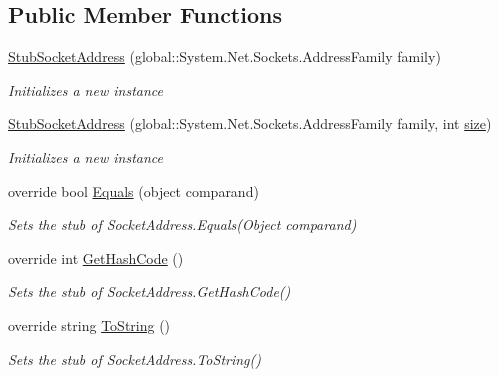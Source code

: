 \subsection*{Public Member Functions}
\begin{DoxyCompactItemize}
\item 
\hyperlink{class_system_1_1_net_1_1_fakes_1_1_stub_socket_address_a22cf09d542b76418ab8414ed43926c1b}{Stub\-Socket\-Address} (global\-::\-System.\-Net.\-Sockets.\-Address\-Family family)
\begin{DoxyCompactList}\small\item\em Initializes a new instance\end{DoxyCompactList}\item 
\hyperlink{class_system_1_1_net_1_1_fakes_1_1_stub_socket_address_a7b9ab31d32c2b97ddd1827447818d75d}{Stub\-Socket\-Address} (global\-::\-System.\-Net.\-Sockets.\-Address\-Family family, int \hyperlink{jquery-1_810_82_8js_afa6806c6ee5e63d5177f1dcc082ba6bc}{size})
\begin{DoxyCompactList}\small\item\em Initializes a new instance\end{DoxyCompactList}\item 
override bool \hyperlink{class_system_1_1_net_1_1_fakes_1_1_stub_socket_address_a2e7cd6dbd55cc830564f8af6611160ef}{Equals} (object comparand)
\begin{DoxyCompactList}\small\item\em Sets the stub of Socket\-Address.\-Equals(\-Object comparand)\end{DoxyCompactList}\item 
override int \hyperlink{class_system_1_1_net_1_1_fakes_1_1_stub_socket_address_a61fce931a33830093c856be7e28f5316}{Get\-Hash\-Code} ()
\begin{DoxyCompactList}\small\item\em Sets the stub of Socket\-Address.\-Get\-Hash\-Code()\end{DoxyCompactList}\item 
override string \hyperlink{class_system_1_1_net_1_1_fakes_1_1_stub_socket_address_adf9f1f87fc444ee955de657ec6b24281}{To\-String} ()
\begin{DoxyCompactList}\small\item\em Sets the stub of Socket\-Address.\-To\-String()\end{DoxyCompactList}\end{DoxyCompactItemize}
